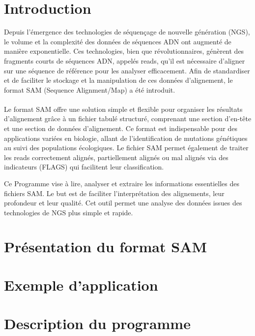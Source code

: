 \documentclass[11pt]{article}
\begin{document}
\section{Introduction}\label{sec:introduction}
Depuis l'émergence des technologies de séquençage de nouvelle génération (NGS), le volume et la complexité des données de séquences ADN ont augmenté de manière exponentielle.
Ces technologies, bien que révolutionnaires, génèrent des fragments courts de séquences ADN, appelés reads, qu'il est nécessaire d'aligner sur une séquence de référence pour les analyser efficacement.
Afin de standardiser et de faciliter le stockage et la manipulation de ces données d'alignement, le format SAM (Sequence Alignment/Map) a été introduit.
\\\\
\noindent Le format SAM offre une solution simple et flexible pour organiser les résultats d'alignement grâce à un fichier tabulé structuré, comprenant une section d'en-tête et une section de données d'alignement.
Ce format est indispensable pour des applications variées en biologie, allant de l'identification de mutations génétiques au suivi des populations écologiques.
Le fichier SAM permet également de traiter les reads correctement alignés, partiellement alignés ou mal alignés via des indicateurs (FLAGS) qui facilitent leur classification.

Ce Programme vise à lire, analyser et extraire les informations essentielles des fichiers SAM\@.
Le but est de faciliter l'interprétation des alignements, leur profondeur et leur qualité.
Cet outil permet une analyse des données issues des technologies de NGS plus simple et rapide.


\section{Présentation du format SAM}\label{sec:presentation-du-format-sam}


\section{Exemple d'application}\label{sec:exemple-d'application}


\section{Description du programme}\label{sec:description-du-programme}
\end{document}
